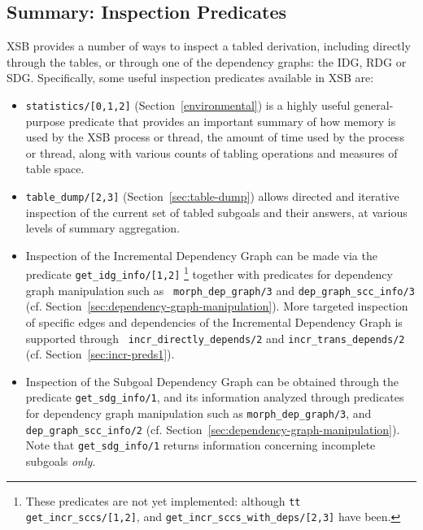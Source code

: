 \subsection{Summary: Inspection Predicates}

XSB provides a number of ways to inspect a tabled derivation,
including directly through the tables, or through one of the
dependency graphs: the IDG, RDG or SDG.  Specifically, some useful
inspection predicates available in XSB are:

\begin{itemize} 
\item {\tt statistics/[0,1,2]} (Section~\ref{environmental}) is a
  highly useful general-purpose predicate that provides an important
  summary of how memory is used by the XSB process or thread, the
  amount of time used by the process or thread, along with various
  counts of tabling operations and measures of table space.

\item {\tt table\_dump/[2,3]} (Section~\ref{sec:table-dump}) allows
  directed and iterative inspection of the current set of tabled
  subgoals and their answers, at various levels of summary
  aggregation.

\item Inspection of the Incremental Dependency Graph can be made via
  the predicate {\tt get\_idg\_info/[1,2]}
\footnote{These predicates
    are not yet implemented: although {\tt tt get\_incr\_sccs/[1,2]},
    and {\tt get\_incr\_sccs\_with\_deps/[2,3]} have been.} together
  with predicates for dependency graph manipulation such as {\tt
    morph\_dep\_graph/3} and {\tt dep\_graph\_scc\_info/3}
  (cf. Section~\ref{sec:dependency-graph-manipulation}).
%
 More targeted inspection of specific edges and dependencies of the
 Incremental Dependency Graph is supported through {\tt
   incr\_directly\_depends/2} and {\tt incr\_trans\_depends/2}
 (cf. Section~\ref{sec:incr-preds1}).

\item Inspection of the Subgoal Dependency Graph can be obtained
  through the predicate {\tt get\_sdg\_info/1}, and its information
  analyzed through predicates for dependency graph manipulation such
  as {\tt morph\_dep\_graph/3}, and {\tt dep\_graph\_scc\_info/2}
  (cf. Section~\ref{sec:dependency-graph-manipulation}).  Note that
  {\tt get\_sdg\_info/1} returns information concerning incomplete 
  subgoals {\em only}.


\end{itemize}
